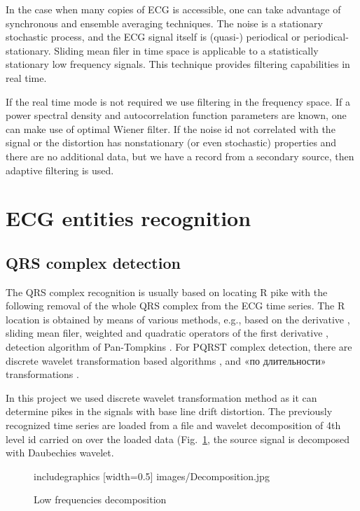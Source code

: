 \documentclass[runningheads]{AIIT}
\newcommand{\nnn}[2][rcolor]{\noindent%
\textcolor{eclr}{}\textcolor{#1}{#2}\textcolor{eclr}{}}
\begin{document}
In the case when many copies of ECG is accessible, one can take advantage of synchronous and ensemble averaging techniques.  The noise is a stationary stochastic process, and the ECG signal itself is (quasi-) periodical or periodical-stationary.  Sliding mean filer in time space is applicable to a statistically stationary low frequency signals.  This technique provides filtering capabilities in real time.

If the real time mode is not required we use filtering in the frequency space.  If a power spectral density and autocorrelation function parameters are known, one can make use of optimal Wiener filter.  If the noise id not correlated with the signal or the distortion has nonstationary (or even stochastic) properties and there are no additional data, but we have a record from a secondary source, then adaptive filtering is used.

\section{ECG entities recognition}
\label{sec:ecg-etit-recogn}

\subsection{QRS complex detection}
\label{sec:qrs-compl-detect}

The QRS complex recognition is usually based on locating R pike with the following removal of the whole QRS complex from the ECG time series.  The R location is obtained by means of various methods, e.g., based on the derivative \cite{2}, sliding mean filer, weighted and quadratic operators of the first derivative \cite{3}, detection algorithm of Pan-Tompkins \cite{4}.  For PQRST complex detection, there are discrete wavelet transformation based algorithms \cite{5, 6}, and \nnn{«по длительности»} transformations \cite{7}.

In this project we used discrete wavelet transformation method as it can determine pikes in the signals with base line drift distortion.  The previously recognized time series are loaded from a file and wavelet decomposition of \nnn{4th level} id carried on over the loaded data (Fig.~\ref{fig:decomp}, the source signal is decomposed with Daubechies wavelet.

\begin{figure}[htb]
  \centering
    includegraphics [width=0.5\linewidth] {images/Decomposition.jpg}
  \caption{Low frequencies decomposition}
  \label{fig:decomp}
\end{figure}
\end{document}
